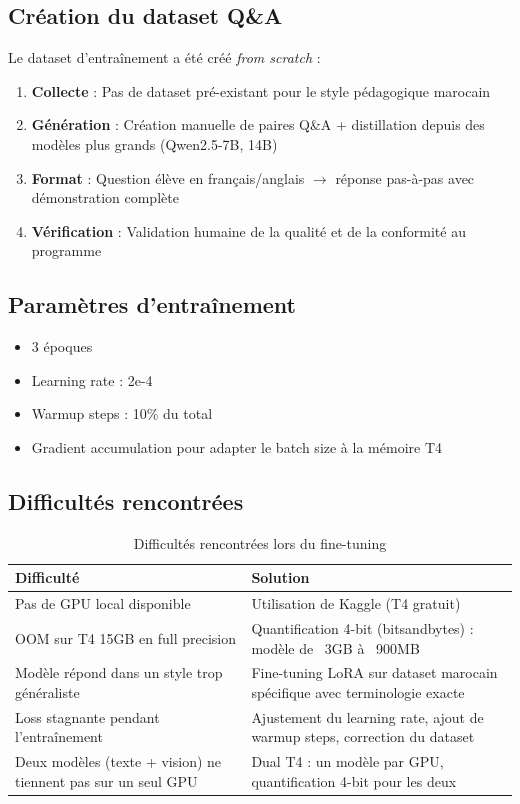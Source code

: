 \documentclass[12pt,a4paper]{report}
\begin{document}
\subsection{Création du dataset Q&A}
Le dataset d'entraînement a été créé \textit{from scratch} :
\begin{enumerate}
    \item \textbf{Collecte} : Pas de dataset pré-existant pour le style pédagogique marocain
    \item \textbf{Génération} : Création manuelle de paires Q\&A + distillation depuis des modèles plus grands (Qwen2.5-7B, 14B)
    \item \textbf{Format} : Question élève en français/anglais $\rightarrow$ réponse pas-à-pas avec démonstration complète
    \item \textbf{Vérification} : Validation humaine de la qualité et de la conformité au programme
\end{enumerate}

\subsection{Paramètres d'entraînement}
\begin{itemize}
    \item 3 époques
    \item Learning rate : 2e-4
    \item Warmup steps : 10\% du total
    \item Gradient accumulation pour adapter le batch size à la mémoire T4
\end{itemize}

\subsection{Difficultés rencontrées}
\begin{table}[h!]
    \centering
    \begin{tabular}{p{6cm} p{8cm}}
        \toprule
        \textbf{Difficulté} & \textbf{Solution} \\
        \midrule
        Pas de GPU local disponible & Utilisation de Kaggle (T4 gratuit) \\
        OOM sur T4 15GB en full precision & Quantification 4-bit (bitsandbytes) : modèle de ~3GB à ~900MB \\
        Modèle répond dans un style trop généraliste & Fine-tuning LoRA sur dataset marocain spécifique avec terminologie exacte \\
        Loss stagnante pendant l'entraînement & Ajustement du learning rate, ajout de warmup steps, correction du dataset \\
        Deux modèles (texte + vision) ne tiennent pas sur un seul GPU & Dual T4 : un modèle par GPU, quantification 4-bit pour les deux \\
        \bottomrule
    \end{tabular}
    \caption{Difficultés rencontrées lors du fine-tuning}
\end{table}
\end{document}
